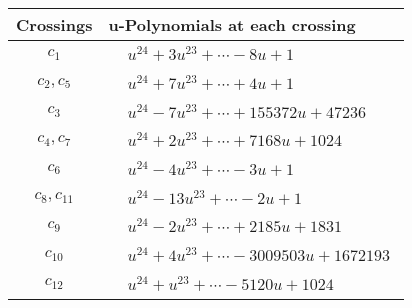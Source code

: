 \documentclass[1p]{elsarticle_modified}
\theoremstyle{definition}
\begin{document}
\begin{tabular}{m{50pt}|m{274pt}}
Crossings & \hspace{64pt}u-Polynomials at each crossing \\
\hline $$\begin{aligned}c_{1}\end{aligned}$$&$\begin{aligned}
&u^{24}+3 u^{23}+\cdots-8 u+1
\end{aligned}$\\
\hline $$\begin{aligned}c_{2},c_{5}\end{aligned}$$&$\begin{aligned}
&u^{24}+7 u^{23}+\cdots+4 u+1
\end{aligned}$\\
\hline $$\begin{aligned}c_{3}\end{aligned}$$&$\begin{aligned}
&u^{24}-7 u^{23}+\cdots+155372 u+47236
\end{aligned}$\\
\hline $$\begin{aligned}c_{4},c_{7}\end{aligned}$$&$\begin{aligned}
&u^{24}+2 u^{23}+\cdots+7168 u+1024
\end{aligned}$\\
\hline $$\begin{aligned}c_{6}\end{aligned}$$&$\begin{aligned}
&u^{24}-4 u^{23}+\cdots-3 u+1
\end{aligned}$\\
\hline $$\begin{aligned}c_{8},c_{11}\end{aligned}$$&$\begin{aligned}
&u^{24}-13 u^{23}+\cdots-2 u+1
\end{aligned}$\\
\hline $$\begin{aligned}c_{9}\end{aligned}$$&$\begin{aligned}
&u^{24}-2 u^{23}+\cdots+2185 u+1831
\end{aligned}$\\
\hline $$\begin{aligned}c_{10}\end{aligned}$$&$\begin{aligned}
&u^{24}+4 u^{23}+\cdots-3009503 u+1672193
\end{aligned}$\\
\hline $$\begin{aligned}c_{12}\end{aligned}$$&$\begin{aligned}
&u^{24}+u^{23}+\cdots-5120 u+1024
\end{aligned}$\\
\hline
\end{tabular}\\~\\
\end{document}
